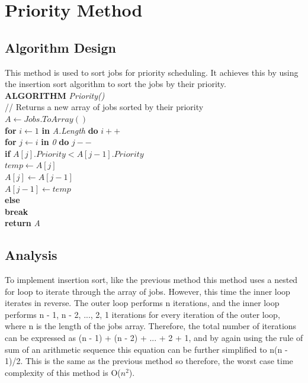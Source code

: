 \documentclass[12pt,a4paper]{article}
\begin{document}
	\section{Priority Method}
		\subsection{Algorithm Design}
			This method is used to sort jobs for priority scheduling. It achieves this by using the 
			insertion sort algorithm to sort the jobs by their priority.\\
			
			\textbf{ALGORITHM} \textit{Priority()}\\
			\null\hspace{1cm}// Returns a new array of jobs sorted by their priority\\
			\null\hspace{1cm}\textit{$A \gets Jobs.ToArray()$}\\
			\null\hspace{1cm}\textbf{for} \textit{$i \gets 1$} \textbf{in} \textit{A.Length} \textbf{do} \textit{$i++$}\\
			\null\hspace{2cm}\textbf{for} \textit{$j \gets i$} \textbf{in} \textit{0} \textbf{do} \textit{$j--$}\\
			\null\hspace{3cm}\textbf{if} \textit{$A[j].Priority < A[j - 1].Priority$}\\
			\null\hspace{4cm}\textit{$temp \gets A[j]$}\\
			\null\hspace{4cm}\textit{$A[j] \gets A[j - 1]$}\\
			\null\hspace{4cm}\textit{$A[j - 1] \gets temp$}\\
			\null\hspace{3cm}\textbf{else}\\
			\null\hspace{4cm}\textbf{break}\\
			\null\hspace{1cm}\textbf{return} \textit{A}\\
		
		\subsection{Analysis}
			To implement insertion sort, like the previous method this method uses a nested for loop to 
			iterate through the array of jobs. However, this time the inner loop iterates in reverse. 
			The outer loop performs n iterations, and the inner loop performs n - 1, n - 2, ..., 2, 1 
			iterations for every iteration of the outer loop, where n is the length of the jobs array. Therefore, 
			the total number of iterations can be expressed as (n - 1) + (n - 2) + ... + 2 + 1, and by again 
			using the rule of sum of an arithmetic sequence this equation can be further simplified to n(n - 1)/2. 
			This is the same as the previous method so therefore, the worst case time complexity of this method 
			is O($n ^ 2$).\\
\end{document}
